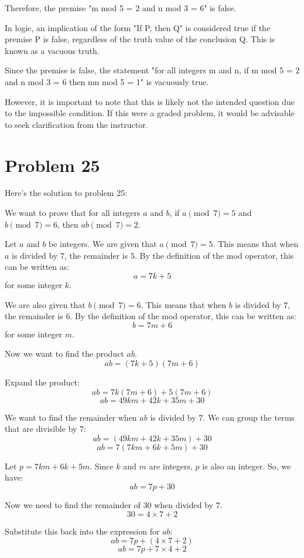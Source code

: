 \documentclass{article}
\begin{document}
Therefore, the premise "m mod 5 = 2 and n mod 3 = 6" is false.

In logic, an implication of the form "If P, then Q" is considered true if the premise P is false, regardless of the truth value of the conclusion Q. This is known as a vacuous truth.

Since the premise is false, the statement "for all integers m and n, if m mod 5 = 2 and n mod 3 = 6 then mn mod 5 = 1" is vacuously true.

However, it is important to note that this is likely not the intended question due to the impossible condition. If this were a graded problem, it would be advisable to seek clarification from the instructor.

\newpage

\section*{Problem 25}
Here's the solution to problem 25:

We want to prove that for all integers $a$ and $b$, if $a \pmod{7} = 5$ and $b \pmod{7} = 6$, then $ab \pmod{7} = 2$.

Let $a$ and $b$ be integers.
We are given that $a \pmod{7} = 5$.
This means that when $a$ is divided by $7$, the remainder is $5$.
By the definition of the mod operator, this can be written as:
$$a = 7k + 5$$
for some integer $k$.

We are also given that $b \pmod{7} = 6$.
This means that when $b$ is divided by $7$, the remainder is $6$.
By the definition of the mod operator, this can be written as:
$$b = 7m + 6$$
for some integer $m$.

Now we want to find the product $ab$.
$$ab = (7k + 5)(7m + 6)$$

Expand the product:
$$ab = 7k(7m + 6) + 5(7m + 6)$$
$$ab = 49km + 42k + 35m + 30$$

We want to find the remainder when $ab$ is divided by $7$. We can group the terms that are divisible by $7$:
$$ab = (49km + 42k + 35m) + 30$$
$$ab = 7(7km + 6k + 5m) + 30$$

Let $p = 7km + 6k + 5m$. Since $k$ and $m$ are integers, $p$ is also an integer.
So, we have:
$$ab = 7p + 30$$

Now we need to find the remainder of $30$ when divided by $7$.
$$30 = 4 \times 7 + 2$$

Substitute this back into the expression for $ab$:
$$ab = 7p + (4 \times 7 + 2)$$
$$ab = 7p + 7 \times 4 + 2$$
\end{document}
